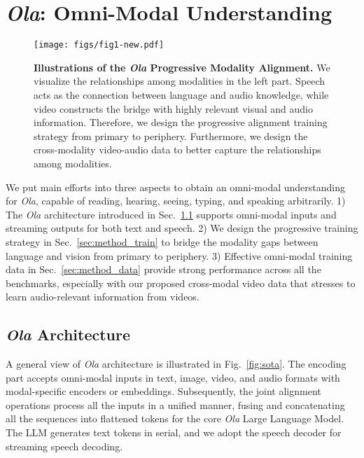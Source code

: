 \section{\emph{\color{Orange}Ola}: Omni-Modal Understanding}
\label{sec:method}

\begin{figure*}[t]
\centering
\texttt{[image: figs/fig1-new.pdf]} 
\caption{\textbf{Illustrations of the \textit{Ola} Progressive Modality Alignment. }We visualize the relationships among modalities in the left part. Speech acts as the connection between language and audio knowledge, while video constructs the bridge with highly relevant visual and audio information. Therefore, we design the progressive alignment training strategy from primary to periphery. Furthermore, we design the cross-modality video-audio data to better capture the relationships among modalities. }
\label{fig:training}
\end{figure*}

We put main efforts into three aspects to obtain an omni-modal understanding for \textit{Ola}, capable of reading, hearing, seeing, typing, and speaking arbitrarily. 1) The \textit{Ola} architecture introduced in Sec.~\ref{sec:method_arch} supports omni-modal inputs and streaming outputs for both text and speech. 2) We design the progressive training strategy in Sec.~\ref{sec:method_train} to bridge the modality gaps between language and vision from primary to periphery. 3) Effective omni-modal training data in Sec.~\ref{sec:method_data} provide strong performance across all the benchmarks, especially with our proposed cross-modal video data that stresses to learn audio-relevant information from videos. 

\subsection{\textit{\textbf{\color{Orange}Ola}} Architecture} \label{sec:method_arch}

A general view of \textit{Ola} architecture is illustrated in Fig.~\ref{fig:sota}. The encoding part accepts omni-modal inputs in text, image, video, and audio formats with modal-specific encoders or embeddings. Subsequently, the joint alignment operations process all the inputs in a unified manner, fusing and concatenating all the sequences into flattened tokens for the core \textit{Ola} Large Language Model. The LLM generates text tokens in serial, and we adopt the speech decoder for streaming speech decoding.

